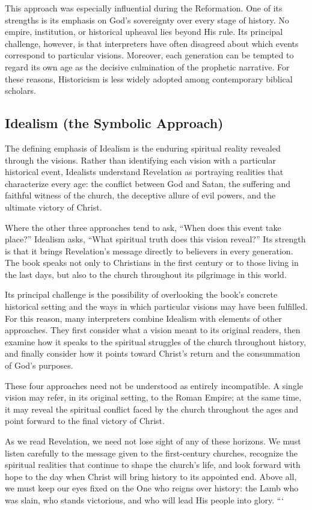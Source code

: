 This approach was especially influential during the Reformation. One of its strengths is its emphasis on God's sovereignty over every stage of history. No empire, institution, or historical upheaval lies beyond His rule. Its principal challenge, however, is that interpreters have often disagreed about which events correspond to particular visions. Moreover, each generation can be tempted to regard its own age as the decisive culmination of the prophetic narrative. For these reasons, Historicism is less widely adopted among contemporary biblical scholars.

\subsection*{Idealism (the Symbolic Approach)}

The defining emphasis of Idealism is the enduring spiritual reality revealed through the visions. Rather than identifying each vision with a particular historical event, Idealists understand Revelation as portraying realities that characterize every age: the conflict between God and Satan, the suffering and faithful witness of the church, the deceptive allure of evil powers, and the ultimate victory of Christ.

Where the other three approaches tend to ask, ``When does this event take place?'' Idealism asks, ``What spiritual truth does this vision reveal?'' Its strength is that it brings Revelation's message directly to believers in every generation. The book speaks not only to Christians in the first century or to those living in the last days, but also to the church throughout its pilgrimage in this world.

Its principal challenge is the possibility of overlooking the book's concrete historical setting and the ways in which particular visions may have been fulfilled. For this reason, many interpreters combine Idealism with elements of other approaches. They first consider what a vision meant to its original readers, then examine how it speaks to the spiritual struggles of the church throughout history, and finally consider how it points toward Christ's return and the consummation of God's purposes.

\medskip

These four approaches need not be understood as entirely incompatible. A single vision may refer, in its original setting, to the Roman Empire; at the same time, it may reveal the spiritual conflict faced by the church throughout the ages and point forward to the final victory of Christ.

As we read Revelation, we need not lose sight of any of these horizons. We must listen carefully to the message given to the first-century churches, recognize the spiritual realities that continue to shape the church's life, and look forward with hope to the day when Christ will bring history to its appointed end. Above all, we must keep our eyes fixed on the One who reigns over history: the Lamb who was slain, who stands victorious, and who will lead His people into glory.
```